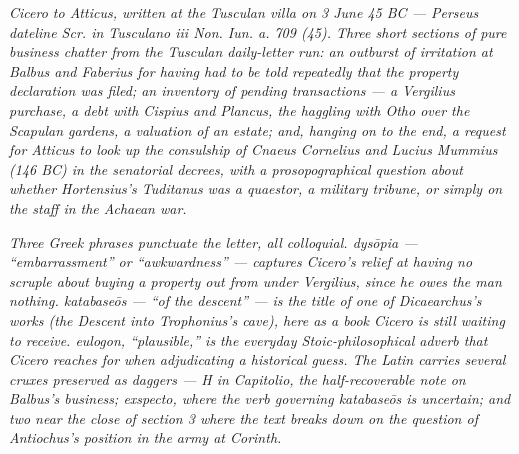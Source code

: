 
\textit{Cicero to Atticus, written at the Tusculan villa on 3 June 45
BC --- Perseus dateline \textit{Scr. in Tusculano iii Non. Iun. a.
709 (45)}. Three short sections of pure business chatter from the
Tusculan daily-letter run: an outburst of irritation at Balbus
and Faberius for having had to be told repeatedly that the
property declaration was filed; an inventory of pending
transactions --- a Vergilius purchase, a debt with Cispius and
Plancus, the haggling with Otho over the Scapulan gardens, a
valuation of an estate; and, hanging on to the end, a request
for Atticus to look up the consulship of Cnaeus Cornelius and
Lucius Mummius (146 BC) in the senatorial decrees, with a
prosopographical question about whether Hortensius's Tuditanus
was a quaestor, a military tribune, or simply on the staff in
the Achaean war.}

\textit{Three Greek phrases punctuate the letter, all colloquial.
\textit{dys\=opia} --- ``embarrassment'' or ``awkwardness'' --- captures
Cicero's relief at having no scruple about buying a property out
from under Vergilius, since he owes the man nothing. \textit{katabase\=os}
--- ``of the descent'' --- is the title of one of Dicaearchus's works
(the \textit{Descent into Trophonius}'s cave), here as a book Cicero
is still waiting to receive. \textit{eulogon}, ``plausible,'' is
the everyday Stoic-philosophical adverb that Cicero reaches for
when adjudicating a historical guess. The Latin carries several
cruxes preserved as daggers --- \textit{H in Capitolio}, the
half-recoverable note on Balbus's business; \textit{exspecto},
where the verb governing \textit{katabase\=os} is uncertain; and
two near the close of section 3 where the text breaks down on the
question of Antiochus's position in the army at Corinth.}
